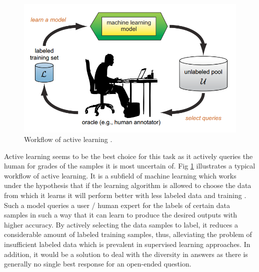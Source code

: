 \documentclass[rnd]{mas_proposal}
\begin{document}
\begin{figure}[h!]
    \includegraphics[width=\textwidth]{images/active_learning}
    \caption{Workflow of active learning \cite{Settles2010}.}
    \label{ac_workflow}
\end{figure}

Active learning seems to be the best choice for this task as it actively queries the human for grades of the samples it is most uncertain of. Fig \ref{ac_workflow} illustrates a typical workflow of active learning. It is a subfield of machine learning which works under the hypothesis that if the learning algorithm is allowed to choose the data from which it learns it will perform better with less labeled data and training \cite{Settles2010}. Such a model queries a user / human expert for the labels of certain data samples in such a way that it can learn to produce the desired outputs with higher accuracy. By actively selecting the data samples to label, it reduces a considerable amount of labeled training samples, thus, alleviating the problem of insufficient labeled data which is prevalent in supervised learning approaches. In addition, it would be a solution to deal with the diversity in answers as there is generally no single best response for an open-ended question.   

\newpage
\end{document}
